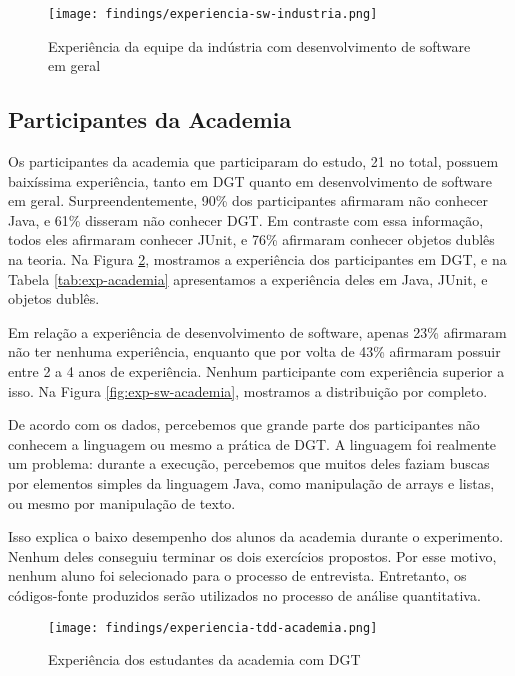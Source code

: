 \begin{figure}[h!]
  \centering
  \texttt{[image: findings/experiencia-sw-industria.png]}
  \caption{Experiência da equipe da indústria com desenvolvimento de software em geral}
  \label{fig:exp-sw-industria}
\end{figure}

\subsection{Participantes da Academia}
\label{findings-desc-academia}

Os participantes da academia que participaram do estudo, 21 no total, possuem baixíssima experiência,
tanto em DGT quanto em desenvolvimento de software em geral. Surpreendentemente, 90\%
dos participantes afirmaram não conhecer Java, e 61\% disseram não conhecer DGT.
Em contraste com essa informação, todos eles afirmaram conhecer JUnit, e 76\% afirmaram
conhecer objetos dublês na teoria. 
Na Figura \ref{fig:exp-tdd-academia}, mostramos a experiência dos participantes em DGT, e
na Tabela \ref{tab:exp-academia} apresentamos a experiência deles em Java, JUnit, e objetos
dublês.

Em relação a experiência de desenvolvimento de software, apenas 23\% afirmaram não
ter nenhuma experiência, enquanto que por volta de 43\% afirmaram possuir
entre 2 a 4 anos de experiência. Nenhum participante com experiência superior a isso.
Na Figura \ref{fig:exp-sw-academia}, mostramos a distribuição por completo.

De acordo com os dados, percebemos que grande parte dos participantes não conhecem a linguagem ou
mesmo a prática de DGT. A linguagem foi realmente um problema: durante a execução, percebemos
que muitos deles faziam buscas por elementos simples da linguagem Java, como manipulação de arrays
e listas, ou mesmo por manipulação de texto.

Isso explica o baixo desempenho dos alunos da academia durante
o experimento. Nenhum deles conseguiu terminar os dois exercícios propostos. Por esse
motivo, nenhum aluno foi selecionado para o processo de entrevista. Entretanto,
os códigos-fonte produzidos serão utilizados no processo de análise quantitativa.

\begin{figure}[h!]
  \centering
  \texttt{[image: findings/experiencia-tdd-academia.png]}
  \caption{Experiência dos estudantes da academia com DGT}
  \label{fig:exp-tdd-academia}
\end{figure}

